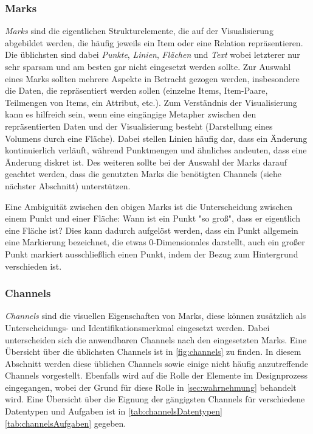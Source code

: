 		\subsubsection{Marks}
			\emph{Marks} sind die eigentlichen Strukturelemente, die auf der Visualisierung abgebildet werden, die häufig jeweils ein Item oder eine Relation repräsentieren. Die üblichsten sind dabei \emph{Punkte}, \emph{Linien}, \emph{Flächen} und \emph{Text} wobei letzterer nur sehr sparsam und am besten gar nicht eingesetzt werden sollte. Zur Auswahl eines Marks sollten mehrere Aspekte in Betracht gezogen werden, insbesondere die Daten, die repräsentiert werden sollen (einzelne Items, Item-Paare, Teilmengen von Items, ein Attribut, etc.). Zum Verständnis der Visualisierung kann es hilfreich sein, wenn eine eingängige Metapher zwischen den repräsentierten Daten und der Visualisierung besteht (\zB Darstellung eines Volumens durch eine Fläche). Dabei stellen Linien häufig dar, dass ein Änderung kontinuierlich verläuft, während Punktmengen und ähnliches andeuten, dass eine Änderung diskret ist. Des weiteren sollte bei der Auswahl der Marks darauf geachtet werden, dass die genutzten Marks die benötigten Channels (siehe nächster Abschnitt) unterstützen.

			Eine Ambiguität zwischen den obigen Marks ist die Unterscheidung zwischen einem Punkt und einer Fläche: Wann ist ein Punkt "so groß", dass er eigentlich eine Fläche ist? Dies kann dadurch aufgelöst werden, dass ein Punkt allgemein eine Markierung bezeichnet, die etwas 0-Dimensionales darstellt, \dh auch ein großer Punkt markiert ausschließlich einen Punkt, indem der Bezug zum Hintergrund verschieden ist.

		\subsubsection{Channels}
			\label{subsubsec:channels}

			\emph{Channels} sind die visuellen Eigenschaften von Marks, \dh diese können zusätzlich als Unterscheidungs- und Identifikationsmerkmal eingesetzt werden. Dabei unterscheiden sich die anwendbaren Channels nach den eingesetzten Marks. Eine Übersicht über die üblichsten Channels ist in \autoref{fig:channels} zu finden. In diesem Abschnitt werden diese üblichen Channels sowie einige nicht häufig anzutreffende Channels vorgestellt. Ebenfalls wird auf die Rolle der Elemente im Designprozess eingegangen, wobei der Grund für diese Rolle in \autoref{sec:wahrnehmung} behandelt wird. Eine Übersicht über die Eignung der gängigsten Channels für verschiedene Datentypen und Aufgaben ist in \autoref{tab:channelsDatentypen} \bzw \autoref{tab:channelsAufgaben} gegeben.

